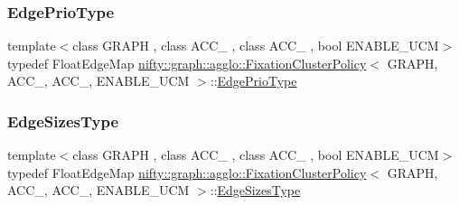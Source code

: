 \subsubsection{\texorpdfstring{Edge\+Prio\+Type}{EdgePrioType}}
{\footnotesize\ttfamily template$<$class G\+R\+A\+PH , class A\+C\+C\+\_ , class A\+C\+C\+\_ , bool E\+N\+A\+B\+L\+E\+\_\+\+U\+CM$>$ \\
typedef Float\+Edge\+Map \hyperlink{classnifty_1_1graph_1_1agglo_1_1FixationClusterPolicy}{nifty\+::graph\+::agglo\+::\+Fixation\+Cluster\+Policy}$<$ G\+R\+A\+PH, A\+C\+C\+\_, A\+C\+C\+\_, E\+N\+A\+B\+L\+E\+\_\+\+U\+CM $>$\+::\hyperlink{classnifty_1_1graph_1_1agglo_1_1FixationClusterPolicy_a7ca35aa593d8bdbd6aa57d4bd24c7c52}{Edge\+Prio\+Type}}

\mbox{\label{classnifty_1_1graph_1_1agglo_1_1FixationClusterPolicy_a06c4c37b4f521ff00308189729d5bf79}} 
\subsubsection{\texorpdfstring{Edge\+Sizes\+Type}{EdgeSizesType}}
{\footnotesize\ttfamily template$<$class G\+R\+A\+PH , class A\+C\+C\+\_ , class A\+C\+C\+\_ , bool E\+N\+A\+B\+L\+E\+\_\+\+U\+CM$>$ \\
typedef Float\+Edge\+Map \hyperlink{classnifty_1_1graph_1_1agglo_1_1FixationClusterPolicy}{nifty\+::graph\+::agglo\+::\+Fixation\+Cluster\+Policy}$<$ G\+R\+A\+PH, A\+C\+C\+\_, A\+C\+C\+\_, E\+N\+A\+B\+L\+E\+\_\+\+U\+CM $>$\+::\hyperlink{classnifty_1_1graph_1_1agglo_1_1FixationClusterPolicy_a06c4c37b4f521ff00308189729d5bf79}{Edge\+Sizes\+Type}}

\mbox{\label{classnifty_1_1graph_1_1agglo_1_1FixationClusterPolicy_a1b20f47fae0c5f5a247ca049bb60400b}} 
